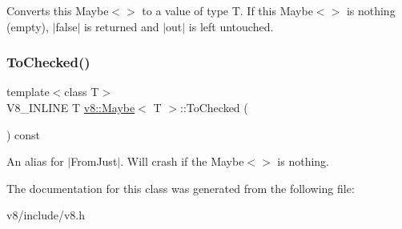 Converts this Maybe$<$$>$ to a value of type T. If this Maybe$<$$>$ is nothing (empty), $\vert$false$\vert$ is returned and $\vert$out$\vert$ is left untouched. \mbox{\label{classv8_1_1Maybe_abf2c0453c947f8c03f8e24b94887d33b}} 
\subsubsection{\texorpdfstring{To\+Checked()}{ToChecked()}}
{\footnotesize\ttfamily template$<$class T$>$ \\
V8\+\_\+\+I\+N\+L\+I\+NE T \mbox{\hyperlink{classv8_1_1Maybe}{v8\+::\+Maybe}}$<$ T $>$\+::To\+Checked (\begin{DoxyParamCaption}{ }\end{DoxyParamCaption}) const\hspace{0.3cm}{\ttfamily [inline]}}

An alias for $\vert$\+From\+Just$\vert$. Will crash if the Maybe$<$$>$ is nothing. 

The documentation for this class was generated from the following file\+:\begin{DoxyCompactItemize}
\item 
v8/include/v8.\+h\end{DoxyCompactItemize}
